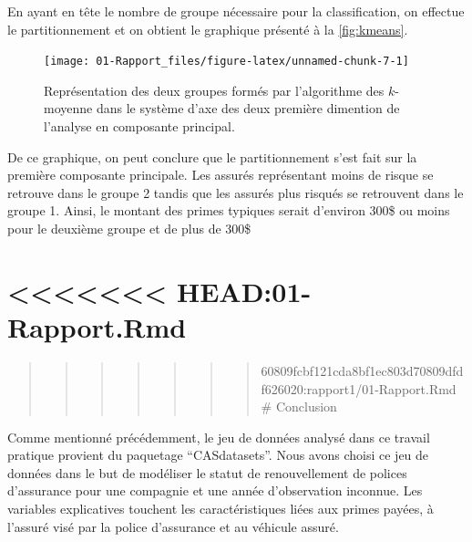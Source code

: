 \documentclass[
]{article}
\begin{document}
En ayant en tête le nombre de groupe nécessaire pour la classification,
on effectue le partitionnement et on obtient le graphique présenté à la
\autoref{fig:kmeans}.

\begin{figure}

{\centering \texttt{[image: 01-Rapport\_files/figure-latex/unnamed-chunk-7-1]} 

}

\caption{\label{fig:kmeans}Représentation des deux groupes formés par l'algorithme des $k$-moyenne dans le système d'axe des deux première dimention de l'analyse en composante principal.}\label{fig:unnamed-chunk-7}
\end{figure}

De ce graphique, on peut conclure que le partitionnement s'est fait sur
la première composante principale. Les assurés représentant moins de
risque se retrouve dans le groupe 2 tandis que les assurés plus risqués
se retrouvent dans le groupe 1. Ainsi, le montant des primes typiques
serait d'environ 300\$ ou moins pour le deuxième groupe et de plus de
300\$

\hypertarget{head01-rapport.rmd}{%
\section{\textless\textless\textless\textless\textless\textless\textless{}
HEAD:01-Rapport.Rmd}\label{head01-rapport.rmd}}

\begin{quote}
\begin{quote}
\begin{quote}
\begin{quote}
\begin{quote}
\begin{quote}
\begin{quote}
60809fcbf121cda8bf1ec803d70809dfdf626020:rapport1/01-Rapport.Rmd
\newpage \# Conclusion
\end{quote}
\end{quote}
\end{quote}
\end{quote}
\end{quote}
\end{quote}
\end{quote}

Comme mentionné précédemment, le jeu de données analysé dans ce travail
pratique provient du paquetage ``CASdatasets''. Nous avons choisi ce jeu
de données dans le but de modéliser le statut de renouvellement de
polices d'assurance pour une compagnie et une année d'observation
inconnue. Les variables explicatives touchent les caractéristiques liées
aux primes payées, à l'assuré visé par la police d'assurance et au
véhicule assuré.
\end{document}
